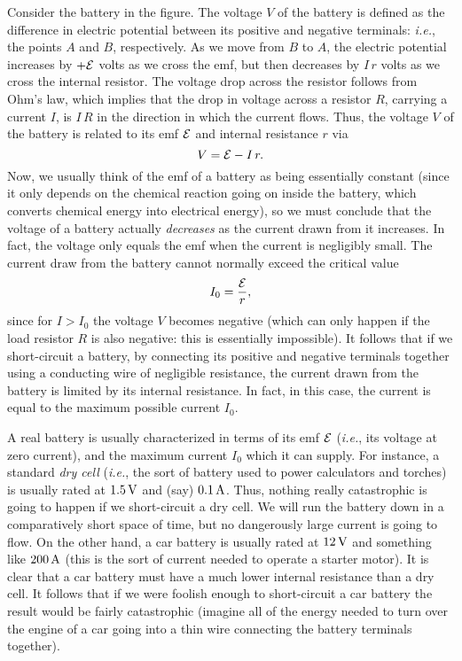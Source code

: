 Consider the battery in the figure. The voltage $V$ of the battery is
defined as the difference in electric potential between its positive and
negative terminals: {\em i.e.}, the points $A$ and $B$, respectively. As we move from $B$ to
$A$, the electric potential increases by $+{\cal E}$ volts as we cross the
emf, but then decreases by $I\,r$ volts as we cross the internal resistor. 
The voltage drop across the resistor follows from Ohm's law, which implies that
the drop in voltage  across a resistor $R$, carrying a current
$I$, is $I\,R$ in the direction in which the
current flows. Thus, the voltage $V$ of the battery is related to its emf 
${\cal E}$ and internal resistance $r$ via
\begin{equation}
V = {\cal E} - I\,r.
\end{equation}
Now, we usually think of the emf of a battery as being essentially constant (since it
 only depends on the chemical reaction going on inside the battery, which converts
chemical energy into electrical energy), so  we  must conclude that the voltage of a
battery actually {\em decreases}\/ as the  current drawn from it increases. 
In fact, the voltage only equals the
emf when the current is negligibly small. The current draw
from the battery cannot normally exceed the critical value
\begin{equation}
I_0=\frac{\cal E}{r},
\end{equation}
since
for $I>I_0$ the voltage $V$  becomes negative (which can only happen
if the load resistor $R$ is also negative: this is essentially impossible).
It follows that if we short-circuit a battery, by connecting its
positive and negative terminals together using  a conducting wire of negligible resistance,
the current drawn from the battery is limited by its internal resistance.
In fact, in this case, the current is equal to the maximum possible
current
$I_0$. 

A real battery is usually characterized in terms of
its  emf ${\cal E}$ ({\em i.e.}, its
voltage at zero current), and the maximum current $I_0$ which it can supply.
 For instance, a standard {\em dry cell}\/ ({\em i.e.}, the sort of
battery used to power calculators and torches) is usually rated at $1.5\,{\rm V}$
and (say) $0.1\,{\rm A}$. Thus, nothing really catastrophic is going to
happen if we short-circuit a dry cell. We will run the battery down in a
comparatively short space of time, but no dangerously large current is going to 
flow. On the other hand, a car battery is usually rated at $12\,{\rm V}$
and something like $200\,{\rm A}$ (this is the sort of current needed to
operate a starter motor). It is clear that a car battery must have a much
lower internal resistance than a dry cell. It follows  that if
we were foolish enough to short-circuit a car battery the result would be
fairly catastrophic (imagine all of the energy needed to turn over the engine of
a car  going into a thin wire connecting the battery terminals together).

